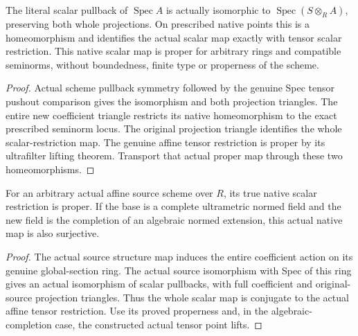 \begin{lemma}
\label{lem:fc-scheme-scalar-affine-tensor}
\leanok
{}
The literal scalar pullback of $\operatorname{Spec}A$ is actually
isomorphic to $\operatorname{Spec}(S\otimes_RA)$, preserving both whole
projections. On prescribed native points this is a homeomorphism and
identifies the actual scalar map exactly with tensor scalar restriction.
This native scalar map is proper for arbitrary rings and compatible
seminorms, without boundedness, finite type or properness of the scheme.
\end{lemma}
\begin{proof}
Actual scheme pullback symmetry followed by the genuine Spec tensor
pushout comparison gives the isomorphism and both projection triangles.
The entire new coefficient triangle restricts its native homeomorphism
to the exact prescribed seminorm locus. The original projection triangle
identifies the whole scalar-restriction map. The genuine affine tensor
restriction is proper by its ultrafilter lifting theorem. Transport
that actual proper map through these two homeomorphisms.
\end{proof}

\begin{lemma}
\label{lem:fc-scheme-scalar-affine-source}
\leanok
{}
For an arbitrary actual affine source scheme over $R$, its true native
scalar restriction is proper. If the base is a complete ultrametric
normed field and the new field is the completion of an algebraic normed
extension, this actual native map is also surjective.
\end{lemma}
\begin{proof}
The actual source structure map induces the entire coefficient action
on its genuine global-section ring. The actual source isomorphism with
Spec of this ring gives an actual isomorphism of scalar pullbacks,
with full coefficient and original-source projection triangles. Thus
the whole scalar map is conjugate to the actual affine tensor
restriction. Use its proved properness and, in the algebraic-completion
case, the constructed actual tensor point lifts.
\end{proof}

